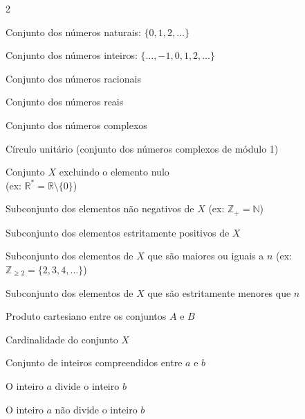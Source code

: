 \documentclass[16pt,openany]{book}
\theoremstyle{definition}
\begin{document}
\begin{multicols}{2}

    \begin{description}[leftmargin=2.2cm, labelwidth=1.8cm, labelsep=0.4cm, itemsep=0.3cm, font=\normalfont]
        \item[{ $\mathbb{N}$ }] Conjunto dos números naturais: $\{0, 1, 2,\ldots\}$
        \item[{ $\mathbb{Z}$ }] Conjunto dos números inteiros: $\{\ldots, -1,0,1,2,\ldots\}$
        \item[{ $\mathbb{Q}$ }] Conjunto dos números racionais
        \item[{ $\mathbb{R}$ }] Conjunto dos números reais
        \item[{ $\mathbb{C}$ }] Conjunto dos números complexos
        \item[{ $\mathbb{U}$ }] Círculo unitário (conjunto dos números complexos de módulo 1)
        \item[{ $X^*$ }] Conjunto $X$ excluindo o elemento nulo \\(ex: $\mathbb{R}^* = \mathbb{R} \setminus \{0\}$)
        \item[{ $X_+$ }] Subconjunto dos elementos não negativos de $X$ (ex: $\mathbb{Z}_+ = \mathbb{N}$)
        \item[{ $X_{+}^{*}$ }] Subconjunto dos elementos estritamente positivos de $X$
        \item[{ $X_{\geq n}$ }] Subconjunto dos elementos de $X$ que são maiores ou iguais a $n$ (ex: $\mathbb{Z}_{\geq 2} = \{2,3,4,\ldots\}$)
        \item[{ $X_{< n}$ }] Subconjunto dos elementos de $X$ que são estritamente menores que $n$
        \item[{ $A \times B$ }] Produto cartesiano entre os conjuntos $A$ e $B$
        \item[{ $\text{Card}(X)$ }] Cardinalidade do conjunto $X$
        \item[{ $\llbracket a, b\rrbracket$ }] Conjunto de inteiros compreendidos entre $a$ e $b$
        \item[{ $a \mid b$ }] O inteiro $a$ divide o inteiro $b$
        \item[{ $a \nmid b$ }] O inteiro $a$ não divide o inteiro $b$
    \end{description}
    
    

\end{multicols}
\end{document}
